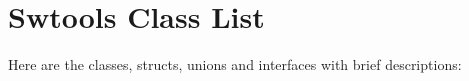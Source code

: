 \section{Swtools Class List}
Here are the classes, structs, unions and interfaces with brief descriptions:\begin{CompactList}
\item{}
\item{}
\end{CompactList}
